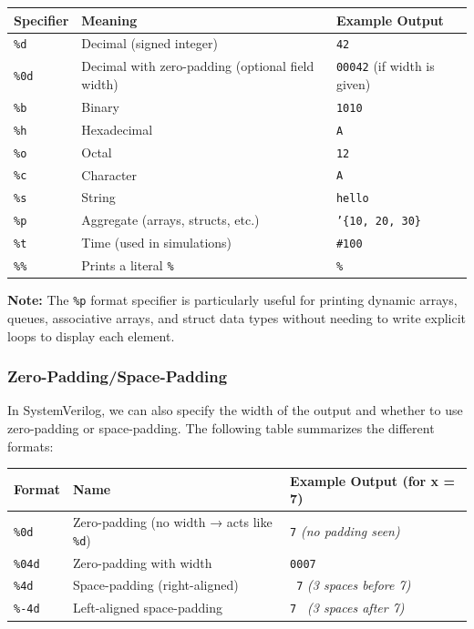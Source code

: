 \documentclass[12pt, a4paper]{article}
\begin{document}
\begin{center}
\begin{tabular}{|l|p{}|p{}|}
\hline
\textbf{Specifier} & \textbf{Meaning} & \textbf{Example Output} \\
\hline
\texttt{\%d} & Decimal (signed integer) & \texttt{42} \\
\hline
\texttt{\%0d} & Decimal with zero-padding (optional field width) & \texttt{00042} (if width is given) \\
\hline
\texttt{\%b} & Binary & \texttt{1010} \\
\hline
\texttt{\%h} & Hexadecimal & \texttt{A} \\
\hline
\texttt{\%o} & Octal & \texttt{12} \\
\hline
\texttt{\%c} & Character & \texttt{A} \\
\hline
\texttt{\%s} & String & \texttt{hello} \\
\hline
\texttt{\%p} & Aggregate (arrays, structs, etc.) & \texttt{'\{10, 20, 30\}} \\
\hline
\texttt{\%t} & Time (used in simulations) & \texttt{\#100} \\
\hline
\texttt{\%\%} & Prints a literal \texttt{\%} & \texttt{\%} \\
\hline
\end{tabular}
\end{center}

\textbf{Note:} The \texttt{\%p} format specifier is particularly useful for printing dynamic arrays, queues, associative arrays, and struct data types without needing to write explicit loops to display each element.

\subsubsection{Zero-Padding/Space-Padding}

In SystemVerilog, we can also specify the width of the output and whether to use zero-padding or space-padding. The following table summarizes the different formats:

\vspace{-0.8em}

\begin{center}
\begin{tabular}{|l|l|p{}|}
\hline
\textbf{Format} & \textbf{Name} & \textbf{Example Output (for x = 7)} \\
\hline
\texttt{\%0d} & Zero-padding (no width → acts like \texttt{\%d}) & \texttt{7} \textit{(no padding seen)} \\
\hline
\texttt{\%04d} & Zero-padding with width & \texttt{0007} \\
\hline
\texttt{\%4d} & Space-padding (right-aligned) & \texttt{   7} \textit{(3 spaces before 7)} \\
\hline
\texttt{\%-4d} & Left-aligned space-padding & \texttt{7   } \textit{(3 spaces after 7)} \\
\hline
\end{tabular}
\end{center}
\end{document}
